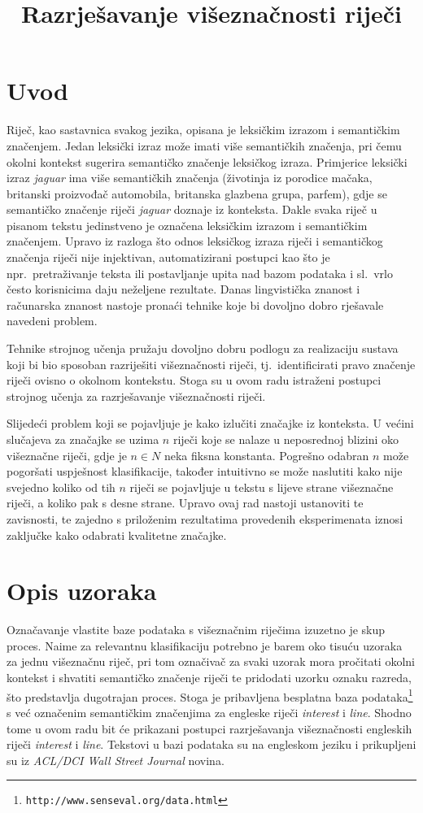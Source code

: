 \documentclass[10pt, a4paper]{article}
\title{Razrješavanje višeznačnosti riječi}
\begin{document}
\maketitleabstract

\section{Uvod}

Riječ, kao sastavnica svakog jezika, opisana je leksičkim izrazom i semantičkim značenjem.
Jedan leksički izraz može imati više semantičkih značenja, pri čemu okolni kontekst
sugerira semantičko značenje leksičkog izraza. 
Primjerice leksički izraz \emph{jaguar} ima više semantičkih značenja
(životinja iz porodice mačaka, britanski proizvođač automobila, 
britanska glazbena grupa, parfem), gdje se semantičko značenje riječi \emph{jaguar}
doznaje iz konteksta. Dakle svaka riječ u pisanom tekstu jedinstveno je označena 
leksičkim izrazom i semantičkim značenjem. Upravo iz razloga što odnos 
leksičkog izraza riječi i semantičkog značenja riječi nije injektivan, 
automatizirani postupci kao što je npr.~pretraživanje teksta ili
postavljanje upita nad bazom podataka i sl.~vrlo često korisnicima 
daju neželjene rezultate. Danas lingvistička znanost i računarska znanost 
nastoje pronaći tehnike koje bi dovoljno dobro 
rješavale navedeni problem.

Tehnike strojnog učenja pružaju dovoljno dobru podlogu za realizaciju sustava
koji bi bio sposoban razriješiti višeznačnosti riječi, tj.~identificirati pravo
značenje riječi ovisno o okolnom kontekstu. Stoga su u ovom radu istraženi postupci
strojnog učenja za razrješavanje višeznačnosti riječi.

Slijedeći problem koji se pojavljuje je kako izlučiti značajke iz konteksta.
U većini slučajeva za značajke se uzima $n$ riječi koje se nalaze u neposrednoj blizini oko višeznačne riječi, gdje je $n \in N$ neka fiksna konstanta. Pogrešno odabran $n$ može pogoršati uspješnost klasifikacije, također intuitivno se može naslutiti kako nije svejedno koliko od tih $n$ riječi se pojavljuje u tekstu s lijeve strane višeznačne riječi, a koliko pak s desne strane.
Upravo ovaj rad nastoji ustanoviti te zavisnosti, te zajedno s priloženim rezultatima provedenih eksperimenata iznosi zaključke kako odabrati kvalitetne značajke.

\section{Opis uzoraka}
Označavanje vlastite baze podataka s višeznačnim riječima izuzetno je
skup proces. Naime za relevantnu klasifikaciju potrebno je barem
oko tisuću uzoraka za jednu višeznačnu riječ, pri tom
označivač za svaki uzorak mora pročitati okolni kontekst i 
shvatiti semantičko značenje riječi te pridodati uzorku oznaku razreda,
što predstavlja dugotrajan proces. Stoga je pribavljena besplatna
baza podataka\footnote{\texttt{http://www.senseval.org/data.html}} s već označenim semantičkim
značenjima za engleske riječi \emph{interest} i \emph{line}. Shodno tome u ovom radu bit će prikazani
postupci razrješavanja višeznačnosti engleskih riječi \emph{interest} i \emph{line}.
Tekstovi u bazi podataka su na engleskom jeziku
i prikupljeni su iz \emph{ACL/DCI Wall Street Journal} novina.
\end{document}
